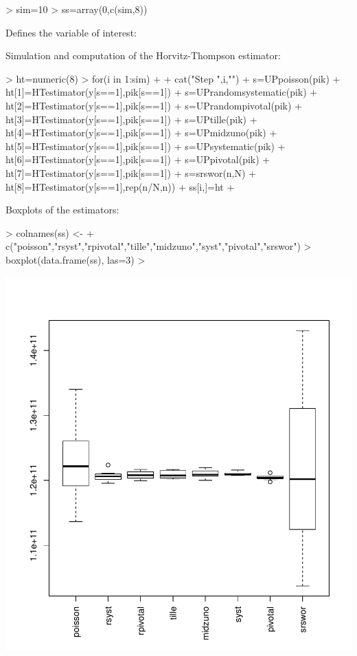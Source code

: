 \documentclass[a4paper]{article}
\begin{document}
\begin{Schunk}
\begin{Sinput}
> sim=10
> ss=array(0,c(sim,8))
\end{Sinput}
\end{Schunk}
Defines the variable of interest:

\begin{Schunk}
\end{Schunk}
Simulation and computation of the Horvitz-Thompson estimator:

\begin{Schunk}
\begin{Sinput}
> ht=numeric(8)
> for(i in 1:sim)
+ {
+ cat("Step ",i,"\n")
+ s=UPpoisson(pik)
+ ht[1]=HTestimator(y[s==1],pik[s==1])
+ s=UPrandomsystematic(pik)
+ ht[2]=HTestimator(y[s==1],pik[s==1])
+ s=UPrandompivotal(pik)
+ ht[3]=HTestimator(y[s==1],pik[s==1])
+ s=UPtille(pik)
+ ht[4]=HTestimator(y[s==1],pik[s==1])
+ s=UPmidzuno(pik)
+ ht[5]=HTestimator(y[s==1],pik[s==1])
+ s=UPsystematic(pik)
+ ht[6]=HTestimator(y[s==1],pik[s==1])
+ s=UPpivotal(pik)
+ ht[7]=HTestimator(y[s==1],pik[s==1])
+ s=srswor(n,N)
+ ht[8]=HTestimator(y[s==1],rep(n/N,n))
+ ss[i,]=ht
+ }
\end{Sinput}
\end{Schunk}
Boxplots of the estimators:

\begin{Schunk}
\begin{Sinput}
> colnames(ss) <- 
+ c("poisson","rsyst","rpivotal","tille","midzuno","syst","pivotal","srswor")
> boxplot(data.frame(ss), las=3)
> 
\end{Sinput}
\end{Schunk}
\includegraphics{UPexamples-up5}
\end{document}
